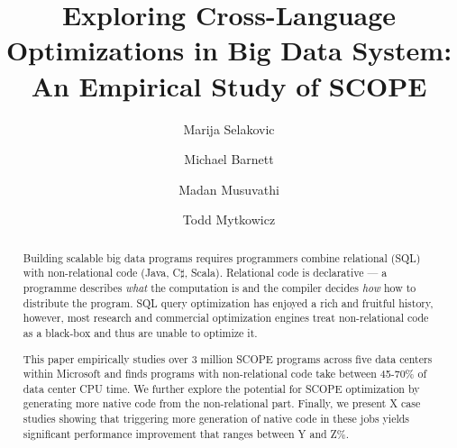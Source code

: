 \documentclass[sigconf, anonymous]{acmart}
\begin{document}
\title{Exploring Cross-Language Optimizations in Big Data System: An Empirical Study of SCOPE}


\author{Marija Selakovic}


\author{Michael Barnett}


\author{Madan Musuvathi}


  



\author{Todd Mytkowicz}


  


\renewcommand{\shortauthors}{M. Selakovic et al.}


\begin{abstract}

  Building scalable big data programs requires programmers combine relational (SQL) with non-relational code (Java, C$\sharp$, Scala).
  Relational code is declarative --- a programme describes \emph{what} the computation is and the compiler decides \emph{how} how to distribute the program.  SQL query optimization has enjoyed a rich and fruitful history, however, most research and commercial optimization engines treat non-relational code as a black-box and thus are unable to optimize it.

  This paper empirically studies over 3 million SCOPE programs across five data centers within Microsoft and finds programs with non-relational code take between 45-70\% of data center CPU time. We further explore the potential for SCOPE optimization by generating more native code from the non-relational part. Finally, we present X case studies showing that triggering more generation of native code in these jobs yields significant performance improvement that ranges between Y and Z\%.

\end{abstract}
\end{document}
